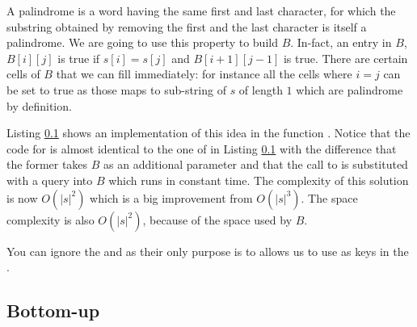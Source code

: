 A palindrome is a word having the same first and last character, for which the substring obtained by
removing the first and the last character is itself a palindrome. We are going to use this property
to build $B$. In-fact, an entry in $B$, $B[i][j]$ is true if $s[i]=s[j]$ and $B[i+1][j-1]$ is true.
There are certain cells of $B$ that we can fill immediately: for instance all the cells where $i=j$
can be set to true as those maps to sub-string of $s$ of length $1$ which are palindrome by
definition. 

Listing \ref{} shows an implementation of this idea in the function . Notice that the
code for  is almost identical to the one of  in Listing \ref{} with the
difference that the former takes $B$ as an additional parameter and that the call to
 is substituted with a query into $B$ which runs in constant time. The
complexity of this solution is now $O(|s|^2)$ which is a big improvement from $O(|s|^3)$. The space
complexity is also $O(|s|^2)$, because of the space used by $B$.

You can ignore the  and  as their only purpose is to 
allows us to use  as keys in the .





\subsection{Bottom-up}


